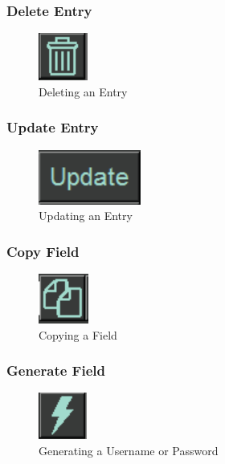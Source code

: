 \documentclass[12pt, titlepage]{article}
\begin{document}
\subsubsection{Delete Entry} \label{DelEnt}

\begin{figure}[h]
	\includegraphics[scale=0.3]{images/DeleteEntry.png}
	\caption{Deleting an Entry}
	\label{fig:DeEnt}
\end{figure}

\subsubsection{Update Entry} \label{UpdateEnt}

\begin{figure}[h]
	\includegraphics[scale=0.3]{images/Update.png}
	\caption{Updating an Entry}
	\label{fig:UpEnt}
\end{figure}

\subsubsection{Copy Field} \label{CopyField}

\begin{figure}[h]
	\includegraphics[scale=0.3]{images/Copy.png}
	\caption{Copying a Field}
	\label{fig:CopF}
\end{figure}

\subsubsection{Generate Field} \label{GenField}

\begin{figure}[h]
	\includegraphics[scale=0.3]{images/Generate.png}
	\caption{Generating a Username or Password}
	\label{fig:genPass}
\end{figure}
\end{document}
